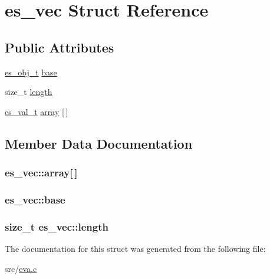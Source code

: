 \hypertarget{structes__vec}{\section{es\-\_\-vec Struct Reference}
\label{structes__vec}
}
\subsection*{Public Attributes}
\begin{DoxyCompactItemize}
\item 
\hyperlink{eva_8h_a3370a89a85f5ff467ca5e7dba47e63bc}{es\-\_\-obj\-\_\-t} \hyperlink{structes__vec_a89dc452026f273486a3b0bc5eeab3f87}{base}
\item 
size\-\_\-t \hyperlink{structes__vec_acff22ee87d6a1f62ba68e65c156e3694}{length}
\item 
\hyperlink{eva_8h_a31286b308f3660f383b567314be88045}{es\-\_\-val\-\_\-t} \hyperlink{structes__vec_ad722ab606783c0b799d5c5c847d9e022}{array} \mbox{[}$\,$\mbox{]}
\end{DoxyCompactItemize}


\subsection{Member Data Documentation}
\hypertarget{structes__vec_ad722ab606783c0b799d5c5c847d9e022}{
\subsubsection[{array}]{ es\-\_\-vec\-::array\mbox{[}$\,$\mbox{]}}}\label{structes__vec_ad722ab606783c0b799d5c5c847d9e022}
\hypertarget{structes__vec_a89dc452026f273486a3b0bc5eeab3f87}{
\subsubsection[{base}]{ es\-\_\-vec\-::base}}\label{structes__vec_a89dc452026f273486a3b0bc5eeab3f87}
\hypertarget{structes__vec_acff22ee87d6a1f62ba68e65c156e3694}{
\subsubsection[{length}]{\setlength{\rightskip}{0pt plus 5cm}size\-\_\-t es\-\_\-vec\-::length}}\label{structes__vec_acff22ee87d6a1f62ba68e65c156e3694}


The documentation for this struct was generated from the following file\-:\begin{DoxyCompactItemize}
\item 
src/\hyperlink{eva_8c}{eva.\-c}\end{DoxyCompactItemize}

